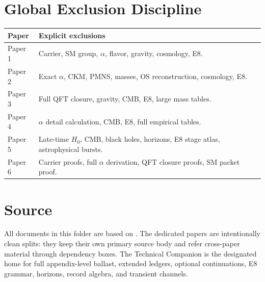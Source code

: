 \documentclass[11pt,a4paper]{article}
\begin{document}
\section{Global Exclusion Discipline}

\begin{center}
\begin{tabularx}{\textwidth}{@{}p{}Y@{}}
\toprule
\textbf{Paper} & \textbf{Explicit exclusions} \\
\midrule
Paper 1 & Carrier, SM group, $\alpha$, flavor, gravity, cosmology, E8. \\
Paper 2 & Exact $\alpha$, CKM, PMNS, masses, OS reconstruction, cosmology, E8. \\
Paper 3 & Full QFT closure, gravity, CMB, E8, large mass tables. \\
Paper 4 & $\alpha$ detail calculation, CMB, E8, full empirical tables. \\
Paper 5 & Late-time $H_0$, CMB, black holes, horizons, E8 stage atlas, astrophysical bursts. \\
Paper 6 & Carrier proofs, full $\alpha$ derivation, QFT closure proofs, SM packet proof. \\
\bottomrule
\end{tabularx}
\end{center}

\section{Source}

All documents in this folder are based on \sourceDraft. The dedicated papers are intentionally
clean splits: they keep their own primary source body and refer cross-paper material through
dependency boxes. The Technical Companion is the designated home for full appendix-level ballast,
extended ledgers, optional continuations, E8 grammar, horizons, record algebra, and transient
channels.
\end{document}
